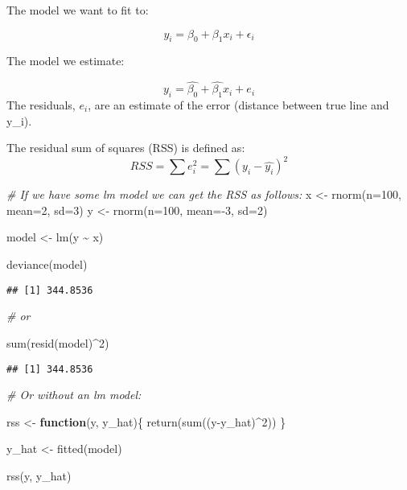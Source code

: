 \documentclass[
]{article}
\newenvironment{Shaded}{\begin{snugshade}}{\end{snugshade}}
\newcommand{\AttributeTok}[1]{\textcolor[rgb]{0.77,0.63,0.00}{#1}}
\newcommand{\CommentTok}[1]{\textcolor[rgb]{0.56,0.35,0.01}{\textit{#1}}}
\newcommand{\ControlFlowTok}[1]{\textcolor[rgb]{0.13,0.29,0.53}{\textbf{#1}}}
\newcommand{\DecValTok}[1]{\textcolor[rgb]{0.00,0.00,0.81}{#1}}
\newcommand{\FunctionTok}[1]{\textcolor[rgb]{0.00,0.00,0.00}{#1}}
\newcommand{\NormalTok}[1]{#1}
\newcommand{\OtherTok}[1]{\textcolor[rgb]{0.56,0.35,0.01}{#1}}
\newcommand{\SpecialCharTok}[1]{\textcolor[rgb]{0.00,0.00,0.00}{#1}}
\begin{document}
The model we want to fit to:

\[y_i=\beta_0+\beta_1x_i+\epsilon_i\]

The model we estimate:

\[y_i=\hat{\beta_0}+\hat{\beta_1}x_i+e_i\] The residuals, \(e_i\), are
an estimate of the error (distance between true line and y\_i).

The residual sum of squares (RSS) is defined as:
\[RSS=\sum e_i^2=\sum(y_i-\hat{y_i})^2\]

\begin{Shaded}
\begin{Highlighting}[]
\CommentTok{\# If we have some lm model we can get the RSS as follows:}
\NormalTok{x }\OtherTok{\textless{}{-}} \FunctionTok{rnorm}\NormalTok{(}\AttributeTok{n=}\DecValTok{100}\NormalTok{, }\AttributeTok{mean=}\DecValTok{2}\NormalTok{, }\AttributeTok{sd=}\DecValTok{3}\NormalTok{)}
\NormalTok{y }\OtherTok{\textless{}{-}} \FunctionTok{rnorm}\NormalTok{(}\AttributeTok{n=}\DecValTok{100}\NormalTok{, }\AttributeTok{mean=}\SpecialCharTok{{-}}\DecValTok{3}\NormalTok{, }\AttributeTok{sd=}\DecValTok{2}\NormalTok{)}

\NormalTok{model }\OtherTok{\textless{}{-}} \FunctionTok{lm}\NormalTok{(y }\SpecialCharTok{\textasciitilde{}}\NormalTok{ x)}

\FunctionTok{deviance}\NormalTok{(model)}
\end{Highlighting}
\end{Shaded}

\begin{verbatim}
## [1] 344.8536
\end{verbatim}

\begin{Shaded}
\begin{Highlighting}[]
\CommentTok{\# or}

\FunctionTok{sum}\NormalTok{(}\FunctionTok{resid}\NormalTok{(model)}\SpecialCharTok{\^{}}\DecValTok{2}\NormalTok{)}
\end{Highlighting}
\end{Shaded}

\begin{verbatim}
## [1] 344.8536
\end{verbatim}

\begin{Shaded}
\begin{Highlighting}[]
\CommentTok{\# Or without an lm model:}

\NormalTok{rss }\OtherTok{\textless{}{-}} \ControlFlowTok{function}\NormalTok{(y, y\_hat)\{}
  \FunctionTok{return}\NormalTok{(}\FunctionTok{sum}\NormalTok{((y}\SpecialCharTok{{-}}\NormalTok{y\_hat)}\SpecialCharTok{\^{}}\DecValTok{2}\NormalTok{))}
\NormalTok{\}}

\NormalTok{y\_hat }\OtherTok{\textless{}{-}} \FunctionTok{fitted}\NormalTok{(model)}

\FunctionTok{rss}\NormalTok{(y, y\_hat)}
\end{Highlighting}
\end{Shaded}
\end{document}

